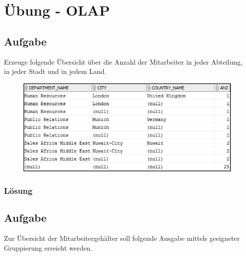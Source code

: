 \section{Übung - OLAP}
\label{sec:uebung_06}

\label{subsec:uebung_06.aufgabe_01}
\subsection{Aufgabe}
Erzeuge folgende Übersicht über die Anzahl der Mitarbeiter in jeder Abteilung, in jeder Stadt und in jedem Land.

\begin{figure}[H]
  \centering
  \includegraphics[width=1\textwidth]{img//uebung_06_-_aufgabe_01.png}
  \label{img:uebung_06_-_aufgabe_01}
\end{figure}

\subsubsection*{Lösung}
\label{subsubsec:uebung_06.aufgabe_01.loesung}


\label{subsec:uebung_06.aufgabe_02}
\subsection{Aufgabe}
Zur Übersicht der Mitarbeitergehälter soll folgende Ausgabe mittels geeigneter Gruppierung erreicht werden.


